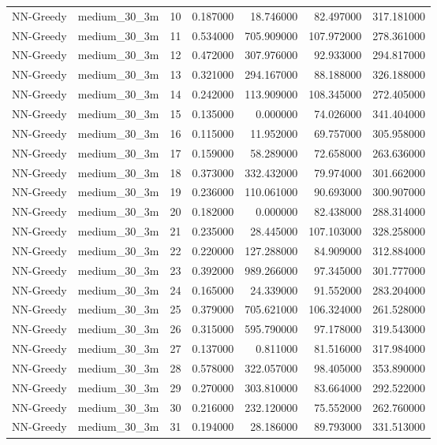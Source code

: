 \begin{tabular}{llrrrrr}
NN-Greedy & medium_30_3m & 10 & 0.187000 & 18.746000 & 82.497000 & 317.181000 \\
NN-Greedy & medium_30_3m & 11 & 0.534000 & 705.909000 & 107.972000 & 278.361000 \\
NN-Greedy & medium_30_3m & 12 & 0.472000 & 307.976000 & 92.933000 & 294.817000 \\
NN-Greedy & medium_30_3m & 13 & 0.321000 & 294.167000 & 88.188000 & 326.188000 \\
NN-Greedy & medium_30_3m & 14 & 0.242000 & 113.909000 & 108.345000 & 272.405000 \\
NN-Greedy & medium_30_3m & 15 & 0.135000 & 0.000000 & 74.026000 & 341.404000 \\
NN-Greedy & medium_30_3m & 16 & 0.115000 & 11.952000 & 69.757000 & 305.958000 \\
NN-Greedy & medium_30_3m & 17 & 0.159000 & 58.289000 & 72.658000 & 263.636000 \\
NN-Greedy & medium_30_3m & 18 & 0.373000 & 332.432000 & 79.974000 & 301.662000 \\
NN-Greedy & medium_30_3m & 19 & 0.236000 & 110.061000 & 90.693000 & 300.907000 \\
NN-Greedy & medium_30_3m & 20 & 0.182000 & 0.000000 & 82.438000 & 288.314000 \\
NN-Greedy & medium_30_3m & 21 & 0.235000 & 28.445000 & 107.103000 & 328.258000 \\
NN-Greedy & medium_30_3m & 22 & 0.220000 & 127.288000 & 84.909000 & 312.884000 \\
NN-Greedy & medium_30_3m & 23 & 0.392000 & 989.266000 & 97.345000 & 301.777000 \\
NN-Greedy & medium_30_3m & 24 & 0.165000 & 24.339000 & 91.552000 & 283.204000 \\
NN-Greedy & medium_30_3m & 25 & 0.379000 & 705.621000 & 106.324000 & 261.528000 \\
NN-Greedy & medium_30_3m & 26 & 0.315000 & 595.790000 & 97.178000 & 319.543000 \\
NN-Greedy & medium_30_3m & 27 & 0.137000 & 0.811000 & 81.516000 & 317.984000 \\
NN-Greedy & medium_30_3m & 28 & 0.578000 & 322.057000 & 98.405000 & 353.890000 \\
NN-Greedy & medium_30_3m & 29 & 0.270000 & 303.810000 & 83.664000 & 292.522000 \\
NN-Greedy & medium_30_3m & 30 & 0.216000 & 232.120000 & 75.552000 & 262.760000 \\
NN-Greedy & medium_30_3m & 31 & 0.194000 & 28.186000 & 89.793000 & 331.513000 \\

\end{tabular}
